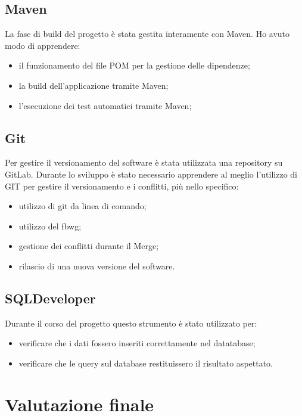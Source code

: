 \subsection{Maven}
La fase di build del progetto è stata gestita interamente con Maven.
Ho avuto modo di apprendere:
\begin{itemize}
    \item il funzionamento del file POM per la gestione delle dipendenze;
    \item la build dell'applicazione tramite Maven;
    \item l'esecuzione dei test automatici tramite Maven;
\end{itemize}

\subsection{Git}
Per gestire il versionamento del software è stata utilizzata una repository su GitLab. Durante lo sviluppo è stato necessario apprendere al meglio l'utilizzo di GIT per gestire il versionamento e i conflitti, più nello specifico:
\begin{itemize}
    \item utilizzo di git da linea di comando;
    \item utilizzo del \gls{fbwg}\glsfirstoccur{};
    \item gestione dei conflitti durante il Merge;
    \item rilascio di una nuova versione del software.
\end{itemize}

\subsection{SQLDeveloper}
Durante il corso del progetto questo strumento è stato utilizzato per:
\begin{itemize}
    \item verificare che i dati fossero inseriti correttamente nel datatabase;
    \item verificare che le query sul database restituissero il risultato aspettato.
\end{itemize}

\section{Valutazione finale}
